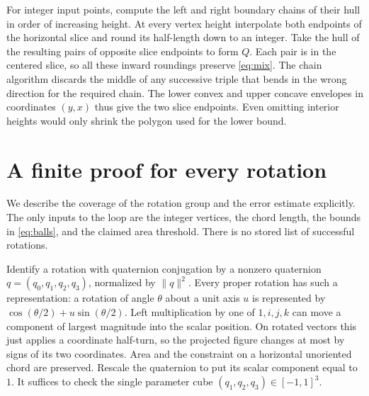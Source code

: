 For integer input points, compute the left and right boundary chains of
their hull in order of increasing height. At every vertex height
interpolate both endpoints of the horizontal slice and round its
half-length down to an integer. Take the hull of the resulting pairs of
opposite slice endpoints to form $Q$. Each pair is in the centered
slice, so all these inward roundings preserve \eqref{eq:mix}. The chain
algorithm discards the middle of any successive triple that bends in the wrong direction for the required chain. The lower convex and upper concave envelopes in coordinates $(y,x)$ thus give the two slice endpoints. Even omitting interior heights would only shrink the polygon used for the lower bound.

\section{A finite proof for every rotation}\label{sec:rotation}

We describe the coverage of the rotation group and the error estimate
explicitly. The only inputs to the loop are the integer vertices, the
chord length, the bounds in \eqref{eq:balls}, and the claimed area
threshold. There is no stored list of successful rotations.

Identify a rotation with quaternion conjugation by a nonzero
quaternion $q=(q_0,q_1,q_2,q_3)$, normalized by $\|q\|^2$.
Every proper rotation has such a representation: a rotation of angle
$\theta$ about a unit axis $u$ is represented by
$\cos(\theta/2)+u\sin(\theta/2)$. Left multiplication by one of
$1,i,j,k$ can move a component of largest magnitude into the scalar
position. On rotated vectors this just applies a coordinate half-turn,
so the projected figure changes at most by signs of its two coordinates.
Area and the constraint on a horizontal unoriented chord are preserved.
Rescale the quaternion to put its scalar component equal to $1$.
It suffices to check the single parameter cube $(q_1,q_2,q_3)\in[-1,1]^3$.


